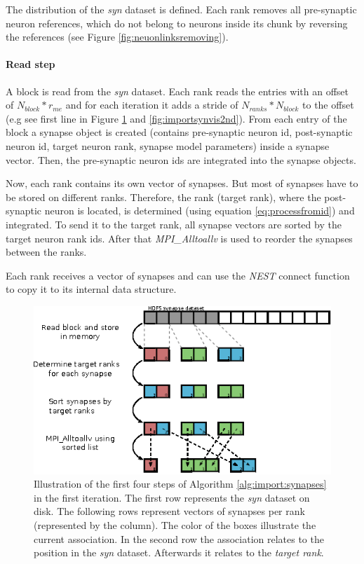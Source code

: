 The distribution of the \emph{syn} dataset is defined.
Each rank removes all pre-synaptic neuron references, which do not belong to
neurons inside its chunk by reversing the references (see Figure \ref{fig:neuonlinksremoving}).

\paragraph{Read step}
A block is read from the \emph{syn} dataset.
Each rank reads the entries with an offset of $N_{block} * r_{me}$ and
for each iteration it adds a stride of $N_{ranks} * N_{block}$  to the offset (e.g see first line in Figure \ref{fig:importsynvis} and \ref{fig:importsynvis2nd}).
From each entry of the block a synapse object is created
(contains pre-synaptic neuron id, post-synaptic neuron id, target neuron rank, synapse model parameters)
inside a synapse vector. Then, the pre-synaptic neuron ids are integrated into the synapse objects.

Now, each rank contains its own vector of synapses.
But most of synapses have to be stored on different ranks.
Therefore, the rank (target rank), where the post-synaptic neuron is located, is determined (using equation \ref{eq:processfromid})
and integrated.
To send it to the target rank, all synapse vectors are sorted by the target neuron rank ids.
After that \emph{MPI\_Alltoallv} is used to reorder the synapses between the ranks.

Each rank receives a vector of synapses and can use the \emph{NEST} connect function to copy it to its internal data structure.
\begin{figure}[ht!]
\centering
\includegraphics[scale=2.0]{pictures/import_syn_vis.eps}
\caption[Illustration of the first four steps of Algorithm \ref{alg:import:synapses} in the first iteration]{Illustration of the first four steps of Algorithm \ref{alg:import:synapses} in the first iteration.
The first row represents the \emph{syn} dataset on disk.
The following rows represent vectors of synapses per rank (represented by the column).
The color of the boxes illustrate the current association.
In the second row the association relates to the position in the \emph{syn} dataset.
Afterwards it relates to the \emph{target rank}.
}
\label{fig:importsynvis}
\end{figure}

